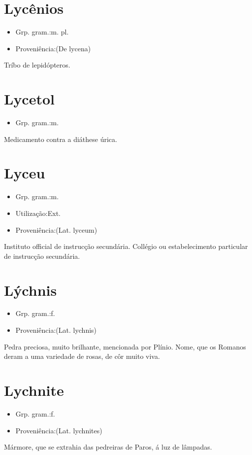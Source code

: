 \section{Lycênios}
\begin{itemize}
\item {Grp. gram.:m. pl.}
\end{itemize}
\begin{itemize}
\item {Proveniência:(De \textunderscore lycena\textunderscore )}
\end{itemize}
Tríbo de lepidópteros.
\section{Lycetol}
\begin{itemize}
\item {Grp. gram.:m.}
\end{itemize}
Medicamento contra a diáthese úrica.
\section{Lyceu}
\begin{itemize}
\item {Grp. gram.:m.}
\end{itemize}
\begin{itemize}
\item {Utilização:Ext.}
\end{itemize}
\begin{itemize}
\item {Proveniência:(Lat. \textunderscore lyceum\textunderscore )}
\end{itemize}
Instituto official de instrucção secundária.
Collégio ou estabelecimento particular de instrucção secundária.
\section{Lýchnis}
\begin{itemize}
\item {Grp. gram.:f.}
\end{itemize}
\begin{itemize}
\item {Proveniência:(Lat. \textunderscore lychnis\textunderscore )}
\end{itemize}
Pedra preciosa, muito brilhante, mencionada por Plínio.
Nome, que os Romanos deram a uma variedade de rosas, de côr muito viva.
\section{Lychnite}
\begin{itemize}
\item {Grp. gram.:f.}
\end{itemize}
\begin{itemize}
\item {Proveniência:(Lat. \textunderscore lychnites\textunderscore )}
\end{itemize}
Mármore, que se extrahia das pedreiras de Paros, á luz de lâmpadas.
